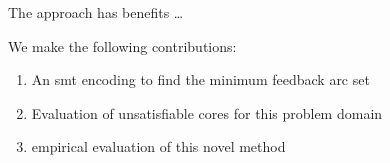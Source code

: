 The approach has benefits \ldots{}

We make the following contributions:
\begin{enumerate}
\item An \ac{smt} encoding to find the minimum feedback arc set
\item Evaluation of unsatisfiable cores for this problem domain
\item empirical evaluation of this novel method
\end{enumerate}



